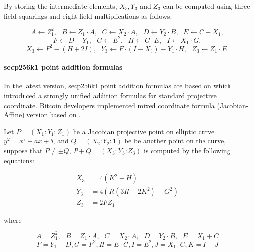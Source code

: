 By storing the intermediate elements, $X_3,Y_3$ and $Z_3$ can be computed using three field squarings and eight field multiplications as follows:

\begin{small}
$$ A \leftarrow Z_1^2, \text{ } B \leftarrow Z_1 \cdot A,  \text{ } C \leftarrow X_2 \cdot A,  \text{ } D \leftarrow Y_2 \cdot B,  \text{ }  E \leftarrow C - X_1,$$
$$ F \leftarrow D - Y_1, \text{ } G \leftarrow E^2, \text{ } H \leftarrow G \cdot E, \text{ } I \leftarrow X_1 \cdot G, $$
$$ X_3 \leftarrow F^2 - (H+2I), \text{ } Y_3 \leftarrow F \cdot (I - X_3) - Y_1 \cdot H, \text{ } Z_3 \leftarrow Z_1 \cdot E.$$
\end{small}

\paragraph{secp256k1 point addition formulas}
In the latest version, secp256k1 point addition formulas are based on \cite{brier2002weierstrass} which introduced a strongly unified addition formulas for standard projective coordinate. Bitcoin developers implemented mixed coordinate formula (Jacobian-Affine) version based on \cite{brier2002weierstrass}. 

Let $P = (X_1:Y_1:Z_1)$ be a Jacobian projective point on elliptic curve $y^2=x^3+ax+b$, and $Q = (X_2:Y_2:1)$ be be another point on the curve, suppose that $P \neq \pm Q$, $P+Q=(X_3:Y_3:Z_3)$ is computed by the following equations:
\begin{small}
\begin{equation} \label{eq:7m5s}
\begin{split}
X_3 &= 4 (K^2 - H) \\
Y_3 &= 4 (R(3H-2K^2)-G^2) \\
Z_3 &= 2 F  Z_1
\end{split}
\end{equation}
\end{small}
where
\begin{small}
$$ A = Z_1^2, \text{ } B = Z_1 \cdot A, \text{ } C = X_2 \cdot A, \text{ } D = Y_2 \cdot B, \text{ } E = X_1 + C $$
$$ F = Y_1 + D, G = F^2, H = E  \cdot G, I = E^2, J = X_1 \cdot C, K = I - J $$
\end{small}
